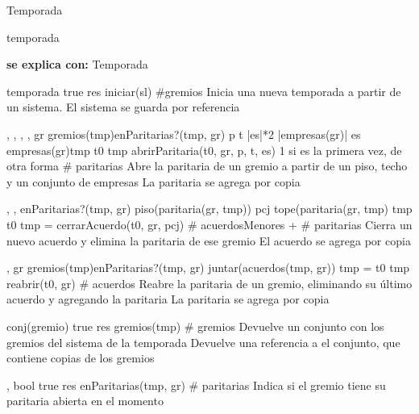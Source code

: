 \begin{interfaz}{Temporada}

\begin{iparamformales}{temporada}

\textbf{\large se explica con:} Temporada

\end{iparamformales}

{}{temporada}
{true}
{res \igobs iniciar(sl)}
{\#gremios}
{Inicia una nueva temporada a partir de un sistema.}
{El sistema se guarda por referencia}

{, , , , }{}
{gr \in gremios(tmp)\ly \neg enParitarias?(tmp, gr) \ly p \leq t \ly |es|*2 \leq |empresas(gr)| \ly es \subseteq empresas(gr)\ly tmp \igobs t0 }
{tmp \igobs abrirParitaria(t0, gr, p, t, es)  }
{1 si es la primera vez, de otra forma \# paritarias}
{Abre la paritaria de un gremio a partir de un piso, techo y un conjunto de empresas}
{La paritaria se agrega por copia}

{,  ,  }{}
{enParitarias?(tmp, gr) \ly piso(paritaria(gr, tmp)) \leq pcj \leq tope(paritaria(gr, tmp) \ly tmp \igobs t0 }
{tmp = cerrarAcuerdo(t0, gr, pcj)}
{ \# acuerdosMenores + \# paritarias}
{Cierra un nuevo acuerdo y elimina la paritaria de ese gremio}
{El acuerdo se agrega por copia}

{, }{}
{gr \in gremios(tmp)\ly \neg enParitarias?(tmp, gr) \ly \emptyset \neq  juntar(acuerdos(tmp, gr)) \ly tmp = t0 }
{tmp \igobs reabrir(t0, gr) }
{\# acuerdos}
{Reabre la paritaria de un gremio, eliminando su último acuerdo y agregando la paritaria}
{La paritaria se agrega por copia}

{}{conj(gremio)}
{true}
{res \igobs gremios(tmp) }
{ \# gremios }
{Devuelve un conjunto con los gremios del sistema de la temporada}
{Devuelve una referencia a el conjunto, que contiene copias de los gremios}

{, }{bool}
{true}
{ res \igobs enParitarias(tmp, gr) }
{\# paritarias}
{Indica si el gremio tiene su paritaria abierta en el momento}
{}


\end{interfaz}
